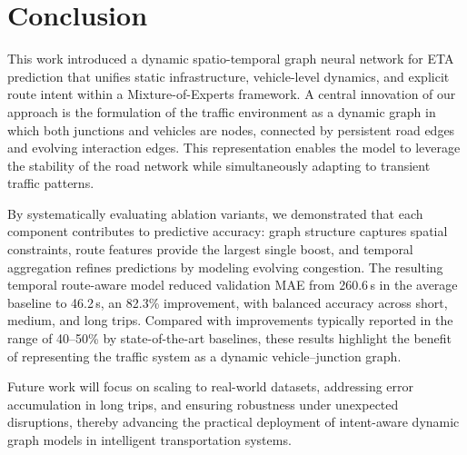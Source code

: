 \section{Conclusion}

This work introduced a dynamic spatio-temporal graph neural network for ETA prediction that unifies static infrastructure, vehicle-level dynamics, and explicit route intent within a Mixture-of-Experts framework. A central innovation of our approach is the formulation of the traffic environment as a dynamic graph in which both junctions and vehicles are nodes, connected by persistent road edges and evolving interaction edges. This representation enables the model to leverage the stability of the road network while simultaneously adapting to transient traffic patterns.  

By systematically evaluating ablation variants, we demonstrated that each component contributes to predictive accuracy: graph structure captures spatial constraints, route features provide the largest single boost, and temporal aggregation refines predictions by modeling evolving congestion. The resulting temporal route-aware model reduced validation MAE from 260.6\,s in the average baseline to 46.2\,s, an 82.3\% improvement, with balanced accuracy across short, medium, and long trips. Compared with improvements typically reported in the range of 40–50\% by state-of-the-art baselines, these results highlight the benefit of representing the traffic system as a dynamic vehicle–junction graph.  

Future work will focus on scaling to real-world datasets, addressing error accumulation in long trips, and ensuring robustness under unexpected disruptions, thereby advancing the practical deployment of intent-aware dynamic graph models in intelligent transportation systems.
